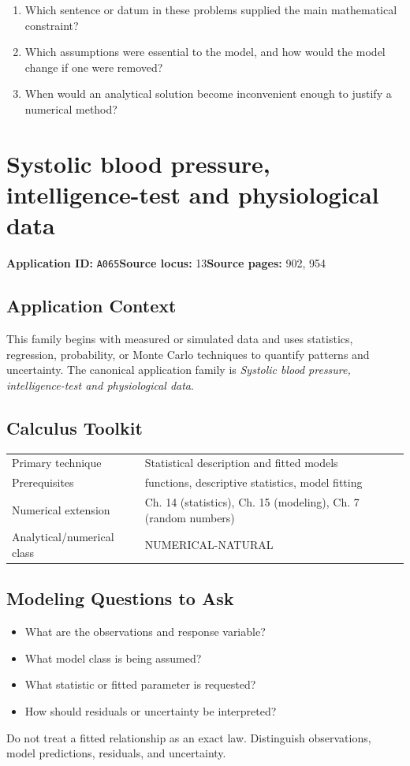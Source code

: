 \documentclass[11pt]{book}
\newcommand{\pid}[1]{\texttt{#1}}
\begin{document}
\begin{reflectionbox}\begin{enumerate}
\item Which sentence or datum in these problems supplied the main mathematical constraint?
\item Which assumptions were essential to the model, and how would the model change if one were removed?
\item When would an analytical solution become inconvenient enough to justify a numerical method?
\end{enumerate}\end{reflectionbox}
\chapter{Systolic blood pressure, intelligence-test and physiological data}\label{app:A065}
\textbf{Application ID:} \pid{A065}\quad \textbf{Source locus:} 13\quad \textbf{Source pages:} 902, 954
\section*{Application Context}
This family begins with measured or simulated data and uses statistics, regression, probability, or Monte Carlo techniques to quantify patterns and uncertainty. The canonical application family is \emph{Systolic blood pressure, intelligence-test and physiological data}.
\section*{Calculus Toolkit}
\begin{tabularx}{\textwidth}{@{}lX@{}}\toprule
Primary technique & Statistical description and fitted models \\
Prerequisites & functions, descriptive statistics, model fitting \\
Numerical extension & Ch. 14 (statistics), Ch. 15 (modeling), Ch. 7 (random numbers) \\
Analytical/numerical class & NUMERICAL-NATURAL \\
\bottomrule\end{tabularx}
\section*{Modeling Questions to Ask}\begin{itemize}
\item What are the observations and response variable?
\item What model class is being assumed?
\item What statistic or fitted parameter is requested?
\item How should residuals or uncertainty be interpreted?
\end{itemize}
\begin{errorbox}Do not treat a fitted relationship as an exact law. Distinguish observations, model predictions, residuals, and uncertainty.\end{errorbox}
\end{document}

